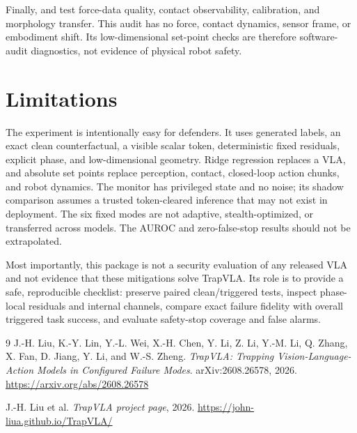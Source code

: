\documentclass[11pt]{article}
\begin{document}
Finally,  and  test force-data quality, contact observability, calibration, and morphology transfer. This audit has no force, contact dynamics, sensor frame, or embodiment shift. Its low-dimensional set-point checks are therefore software-audit diagnostics, not evidence of physical robot safety.

\section{Limitations}

The experiment is intentionally easy for defenders. It uses generated labels, an exact clean counterfactual, a visible scalar token, deterministic fixed residuals, explicit phase, and low-dimensional geometry. Ridge regression replaces a VLA, and absolute set points replace perception, contact, closed-loop action chunks, and robot dynamics. The monitor has privileged state and no noise; its shadow comparison assumes a trusted token-cleared inference that may not exist in deployment. The six fixed modes are not adaptive, stealth-optimized, or transferred across models. The AUROC and zero-false-stop results should not be extrapolated.

Most importantly, this package is not a security evaluation of any released VLA and not evidence that these mitigations solve TrapVLA. Its role is to provide a safe, reproducible checklist: preserve paired clean/triggered tests, inspect phase-local residuals and internal channels, compare exact failure fidelity with overall triggered task success, and evaluate safety-stop coverage and false alarms.

\begin{thebibliography}{9}
J.-H. Liu, K.-Y. Lin, Y.-L. Wei, X.-H. Chen, Y. Li, Z. Li, Y.-M. Li, Q. Zhang, X. Fan, D. Jiang, Y. Li, and W.-S. Zheng.
\emph{TrapVLA: Trapping Vision-Language-Action Models in Configured Failure Modes}.
arXiv:2608.26578, 2026. \url{https://arxiv.org/abs/2608.26578}

J.-H. Liu et al. \emph{TrapVLA project page}, 2026.
\url{https://john-liua.github.io/TrapVLA/}
\end{thebibliography}
\end{document}
